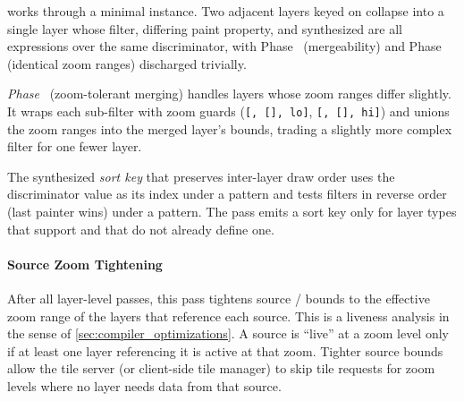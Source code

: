  works through a minimal instance.
Two adjacent  layers keyed on  collapse into a single layer whose filter, differing paint property, and synthesized  are all  expressions over the same discriminator, with Phase~ (mergeability) and Phase~ (identical zoom ranges) discharged trivially.

\emph{Phase}~ (zoom-tolerant merging) handles layers whose zoom ranges differ slightly.
It wraps each sub-filter with zoom guards (\texttt{[,\allowbreak~[],\allowbreak~lo]}, \texttt{[,\allowbreak~[],\allowbreak~hi]}) and unions the zoom ranges into the merged layer's bounds, trading a slightly more complex filter for one fewer layer.

The synthesized \emph{sort key} that preserves inter-layer draw order uses the discriminator value as its index under a  pattern and tests filters in reverse order (last painter wins) under a  pattern.
The pass emits a sort key only for layer types that support  and that do not already define one.

\paragraph{Source Zoom Tightening}
After all layer-level passes, this pass tightens source /  bounds to the effective zoom range of the layers that reference each source.
This is a liveness analysis in the sense of \cref{sec:compiler_optimizations}.
A source is \enquote{live} at a zoom level only if at least one layer referencing it is active at that zoom.
Tighter source bounds allow the tile server (or client-side tile manager) to skip tile requests for zoom levels where no layer needs data from that source.

